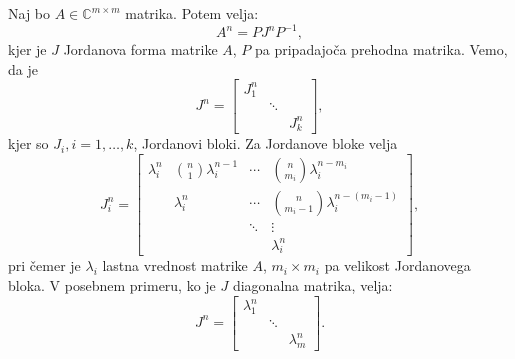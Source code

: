 \documentclass[mat1]{fmfdelo}
\newcommand{\C}{\mathbb C}
\begin{document}
\begin{zgled} 
    Naj bo $A \in \C^{m\times m}$ matrika. Potem velja:
    \begin{equation*}
        A^n = PJ^nP^{-1},
    \end{equation*}
    kjer je $J$ Jordanova forma matrike $A$, $P$ pa pripadajoča prehodna matrika. Vemo, da je
    \begin{equation*}
        J^n = 
        \begin{bmatrix}
            J_1^n & & \\
            & \ddots & \\
            & & J_k^n
        \end{bmatrix},
    \end{equation*}
    kjer so $J_i, i=1,\ldots,k$, Jordanovi bloki. Za Jordanove bloke velja
    \begin{equation*}
        J_i^n = 
        \begin{bmatrix}
            \lambda_i^n & {n \choose 1}\lambda_i^{n-1} & \cdots & {n \choose m_i} \lambda_i^{n-m_i} \\
            & \lambda_i^n & \cdots  & {n \choose m_i-1} \lambda_i^{n-(m_i-1)} \\
            & & \ddots  & \vdots \\
            & & & \lambda_i^n
        \end{bmatrix},
    \end{equation*}
    pri čemer je $\lambda_i$ lastna vrednost matrike $A$, $m_i \times m_i$ pa velikost Jordanovega bloka.
    V posebnem primeru, ko je $J$ diagonalna matrika, velja:
    \begin{equation*}
        J^n = 
        \begin{bmatrix}
            \lambda_1^n & & \\
            & \ddots & \\
            & & \lambda_m^n
        \end{bmatrix}.
    \end{equation*}


\end{zgled}
\end{document}
